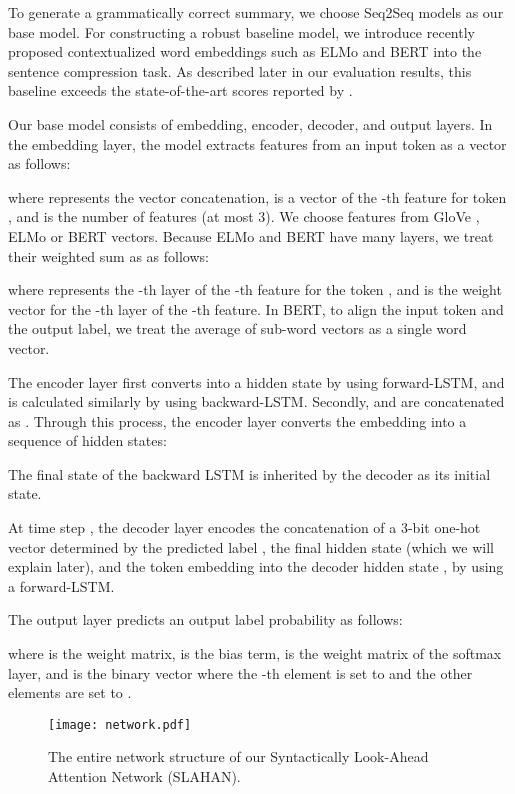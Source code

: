 \documentclass[letterpaper]{article} \usepackage{aaai20}  \usepackage{times}  \usepackage{helvet} \usepackage{courier}  \usepackage[hyphens]{url}  \usepackage{graphicx} \urlstyle{rm} \def\UrlFont{\rm}  \usepackage{graphicx}  \frenchspacing  \setlength{\pdfpagewidth}{8.5in}  \setlength{\pdfpageheight}{11in}  \usepackage{tabu}
\newcommand{\newcite}[1]{\citeauthor{#1} \shortcite{#1}}
\begin{document}
To generate a grammatically correct summary, we choose Seq2Seq models as our base model.
For constructing a robust baseline model, we introduce recently proposed contextualized word embeddings such as ELMo \cite{peters-etal-2018-deep} and BERT \cite{devlin2018bert} into the sentence compression task.
As described later in our evaluation results, this baseline exceeds the state-of-the-art  scores reported by \newcite{zhao-etal-2018-language}.

Our base model consists of embedding, encoder, decoder, and output layers.
In the embedding layer, the model extracts features from an input token  as a vector  as follows:

where  represents the vector concatenation,  is
a vector of the -th feature for token , and  is the number of features (at most 3). We choose features from GloVe \cite{pennington2014glove}, ELMo or BERT vectors.
Because ELMo and BERT have many layers, we treat their weighted sum as  as follows:

where  represents the
-th layer of the -th feature for the token , and  is the weight vector for
the -th layer of the -th feature. In BERT, to align the input token and the output label, we treat the average of sub-word vectors as a single word vector.

The encoder layer first converts  into a hidden state  by using forward-LSTM, and  is calculated similarly by using backward-LSTM.
Secondly,  and  are concatenated as .
Through this process, the encoder layer converts the embedding  into a sequence of hidden states:

The final state of the backward LSTM  is inherited by the decoder as its initial state.

At time step , the decoder layer encodes the concatenation of a 3-bit one-hot vector determined by the predicted label , the final hidden state  (which we will explain later), 
and the token embedding  into the decoder hidden state , by using a forward-LSTM.

The output layer predicts an output label probability as follows:

where  is the weight matrix,  is the bias term,  is the weight matrix of the softmax layer, and  is the
binary vector where the -th element is set to  and the other elements are set to .

\begin{figure*}
    \centering
    \texttt{[image: network.pdf]}
    \caption{The entire network structure of our Syntactically Look-Ahead Attention Network (SLAHAN).}
    \label{fig:my_label}
\end{figure*}
\end{document}
